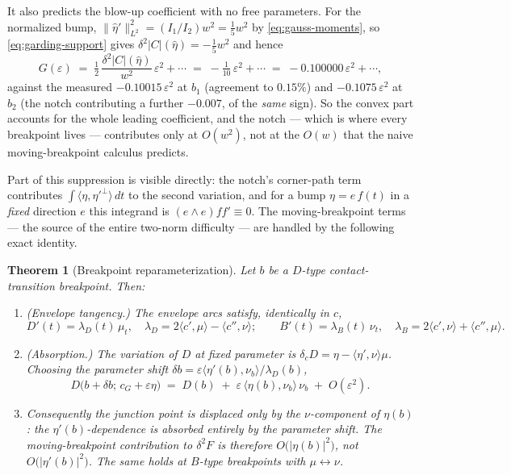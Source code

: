 \documentclass[11pt]{amsart}
\theoremstyle{plain}
\newtheorem{theorem}{Theorem}
\theoremstyle{definition}
\newcommand{\cG}{c_{G}}
\begin{document}
It also predicts the blow-up coefficient with no free parameters.  For
the normalized bump, $\|\hat\eta'\|^{2}_{L^{2}} = (I_{1}/I_{2})w^{2} =
\tfrac15 w^{2}$ by \eqref{eq:gauss-moments}, so
\eqref{eq:garding-support} gives $\delta^{2}|C|(\hat\eta) =
-\tfrac15w^{2}$ and hence
\begin{equation}\label{eq:G-predicted}
   G(\varepsilon) \;=\; \tfrac12\,\frac{\delta^{2}|C|(\hat\eta)}{w^{2}}\,
   \varepsilon^{2} + \cdots \;=\; -\tfrac1{10}\,\varepsilon^{2} + \cdots
   \;=\; -0.100000\,\varepsilon^{2}+\cdots,
\end{equation}
against the measured $-0.10015\,\varepsilon^{2}$ at $b_{1}$ (agreement
to $0.15\%$) and $-0.1075\,\varepsilon^{2}$ at $b_{2}$ (the notch
contributing a further $-0.007$, of the \emph{same} sign).  So the
convex part accounts for the whole leading coefficient, and the notch ---
which is where every breakpoint lives --- contributes only at
$O(w^{2})$, not at the $O(w)$ that the naive moving-breakpoint calculus
predicts.

Part of this suppression is visible directly: the notch's corner-path
term contributes $\int\langle\eta,\eta'^{\perp}\rangle\,dt$ to the
second variation, and for a bump $\eta = e\,f(t)$ in a \emph{fixed}
direction $e$ this integrand is $(e\wedge e)ff' \equiv 0$.  The
moving-breakpoint terms --- the source of the entire two-norm
difficulty --- are handled by the following exact identity.

\begin{theorem}[Breakpoint reparameterization]\label{thm:reparam}
Let $b$ be a $D$-type contact-transition breakpoint.  Then:
\begin{enumerate}
\item[(i)] \emph{(Envelope tangency.)}  The envelope arcs satisfy,
identically in $c$,
\begin{equation}\label{eq:env-tangent}
   D'(t) = \lambda_{D}(t)\,\mu_{t},
   \quad \lambda_{D} = 2\langle c',\mu\rangle-\langle c'',\nu\rangle;
   \qquad
   B'(t) = \lambda_{B}(t)\,\nu_{t},
   \quad \lambda_{B} = 2\langle c',\nu\rangle+\langle c'',\mu\rangle .
\end{equation}
\item[(ii)] \emph{(Absorption.)}  The variation of $D$ at fixed
parameter is $\delta_{c}D = \eta - \langle\eta',\nu\rangle\mu$.  Choosing
the parameter shift $\delta b = \varepsilon\langle\eta'(b),\nu_{b}\rangle
/\lambda_{D}(b)$,
\begin{equation}\label{eq:junction-stationary}
   D\bigl(b+\delta b;\,\cG+\varepsilon\eta\bigr)
   \;=\; D(b) \;+\; \varepsilon\,\langle\eta(b),\nu_{b}\rangle\,\nu_{b}
   \;+\; O(\varepsilon^{2}).
\end{equation}
\item[(iii)] Consequently the junction \emph{point} is displaced only by
the $\nu$-component of $\eta(b)$: the $\eta'(b)$-dependence is absorbed
entirely by the parameter shift.  The moving-breakpoint contribution to
$\delta^{2}F$ is therefore $O\bigl(|\eta(b)|^{2}\bigr)$, \emph{not}
$O\bigl(|\eta'(b)|^{2}\bigr)$.  The same holds at $B$-type breakpoints
with $\mu\leftrightarrow\nu$.
\end{enumerate}
\end{theorem}
\end{document}
